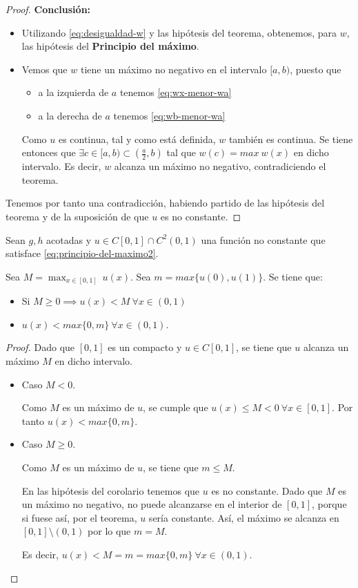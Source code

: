 \begin{proof}
\noindent\textbf{Conclusión:}
\begin{itemize}
\item Utilizando \eqref{eq:desigualdad-w} y las hipótesis del teorema, obtenemos, para $w$, las hipótesis del \textbf{Principio del máximo}.
\item Vemos que $w$ tiene un máximo no negativo en el intervalo $[a, b)$, puesto que
\begin{itemize}
\item a la izquierda de $a$ tenemos \eqref{eq:wx-menor-wa}
\item a la derecha de $a$ tenemos \eqref{eq:wb-menor-wa}
\end{itemize}
Como $u$ es continua, tal y como está definida, $w$ también es continua. Se tiene entonces que $\exists c \in [a, b) \subset (\frac{a}{2}, b)$ tal que $w(c) = max\ w(x)$ en dicho intervalo. Es decir, $w$ alcanza un máximo no negativo, contradiciendo el teorema.
\end{itemize}
\newpage
Tenemos por tanto una contradicción, habiendo partido de las hipótesis del teorema y de la suposición de que $u$ es no constante.
\end{proof}

\corol
Sean $g,h$ acotadas y $u\in C[0,1] \cap C^2(0,1)$ una función no constante que satisface \eqref{eq:principio-del-maximo2}. 

Sea $M = \max_{x \in [0,1]}\ u(x)$. Sea $m = max\{u(0), u(1)\}$. Se tiene que:
\begin{itemize}
\item Si $M \ge 0 \implies u(x) < M\ \forall x\in(0,1)$
\item $u(x) < max\{0,m\}\ \forall x\in(0,1)$.
\end{itemize}

\begin{proof}
Dado que $[0,1]$ es un compacto y $u\in C[0,1]$, se tiene que $u$ alcanza un máximo $M$ en dicho intervalo.

\begin{itemize}
\item Caso $M<0$.

Como $M$ es un máximo de $u$, se cumple que $u(x) \le M < 0\ \forall x\in[0,1]$. Por tanto $u(x) < max\{0, m\}$.

\item Caso $M\ge 0$. 

Como $M$ es un máximo de $u$, se tiene que $m \le M$.

En las hipótesis del corolario tenemos que $u$ es no constante. Dado que $M$ es un máximo no negativo, no puede alcanzarse en el interior de $[0,1]$, porque si fuese así, por el teorema, $u$ sería constante. Así, el máximo se alcanza en $[0,1]\setminus(0,1)$ por lo que $m = M$.

Es decir, $u(x) < M = m = max\{0, m\}\ \forall x\in (0,1)$.
\end{itemize}
\end{proof}

